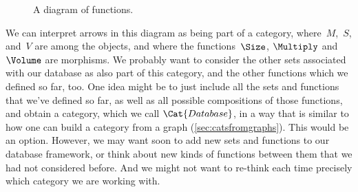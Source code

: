 

\begin{figure}[h!]
    \begin{center}
    \end{center}
    \caption{A diagram of functions. \label{fig:diagram_functions}}
\end{figure}

We can interpret arrows in this diagram as being part of a category, where~$M$,~$S$, and~$V$ are among the objects, and where the functions~$\Size$, $\Multiply$ and~$\Volume$ are morphisms. We probably want to consider the other sets associated with our database as also part of this category, and the other functions which we defined so far, too. One idea might be to just include all the sets and functions that we've defined so far, as well as all possible compositions of those functions, and obtain a category, which we call $\Cat{Database}$, in a way that is similar to how one can build a category from a graph (\cref{sec:catsfromgraphs}). This would be an option. However, we may want soon to add new sets and functions to our database framework, or think about new kinds of functions between them that we had not considered before. And we might not want to re-think each time precisely which category we are working with.
